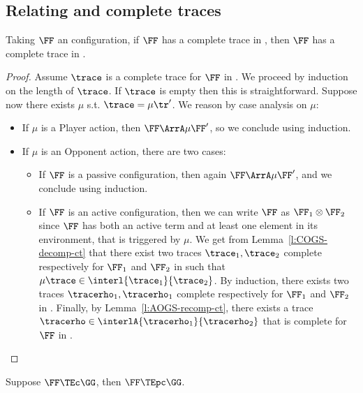 \subsection{Relating \AOGS and \COGS complete traces}
\label{a:aogs-cogs-complete}


\begin{lemma}
\label{l:CtoCA}
Taking $\FF$ an \AOGS configuration,
if $\FF$ has a complete trace in \COGS, then $\FF$ 
has a complete trace in \AOGS. 
\end{lemma}

\begin{proof}
Assume $\trace $ is a complete trace
for $\FF$ in \COGS.
We proceed by induction on the length of $\trace $.
If $\trace$ is empty then this is straightforward.
Suppose now there exists $\mu$ s.t. 
$\trace = \mu \tr'$. We reason by case analysis on $\mu$:
\begin{itemize}
\item If $\mu$ is a Player action,
then $\FF \ArrA \mu \FF'$, so we conclude using induction.
\item If $\mu$ is an Opponent action,
there are two cases:
\begin{itemize}
\item If $\FF$ is a passive configuration, 
then again $\FF \ArrA \mu \FF'$, and we conclude using induction.
\item If $\FF$ is an active configuration, then we can write
$\FF$ as $\FF_1 \otimes \FF_2$ since $\FF$ has both
an active term and at least one element in its environment,
that is triggered by $\mu$.
We get from Lemma~\ref{l:COGS-decomp-ct}
that there exist two traces $\trace_1,\trace_2$ complete respectively for
$\FF_1$ and $\FF_2$ in \COGS such that $\mu \trace \in \interl{\trace_1}{\trace_2}$.
By induction, there exists two traces $\tracerho_1,\tracerho_1$ 
complete respectively for $\FF_1$ and $\FF_2$ in \AOGS.
%
Finally,
by Lemma~\ref{l:AOGS-recomp-ct}, there exists a trace
$\tracerho \in \interlA{\tracerho_1}{\tracerho_2}$
that is complete for $\FF$ in \AOGS.
\qedhere
\end{itemize}
\end{itemize}
\end{proof} 

\begin{lemma}
\label{l:mainCC-CA}
Suppose 
$\FF  \TEc \GG$,
then
$\FF  \TEpc \GG$.
\end{lemma}   

